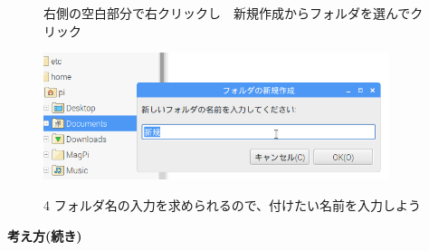 \documentclass[a4paper,12pt]{jarticle}
\begin{document}
\begin{figure}[ht]
  \begin{minipage}{15.758cm}
    右側の空白部分で右クリックし　新規作成からフォルダを選んでクリック
  \end{minipage}
  \begin{minipage}{\textwidth}
    \includegraphics[width=0.9\textwidth]{textbook-img036.png}
  \end{minipage}
  \begin{minipage}{12.336cm}
    4
    フォルダ名の入力を求められるので、付けたい名前を入力しよう
  \end{minipage}
\end{figure}
\clearpage
{\bf\large 考え方(続き)}
\end{document}

